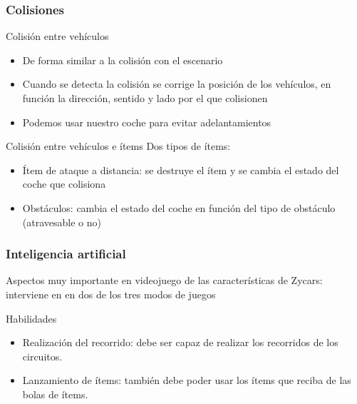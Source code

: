 \begin{frame}
    \frametitle{Colisiones}
    
    \begin{block}{Colisión entre vehículos}
        \begin{itemize}
            \item De forma similar a la colisión con el escenario
            \item Cuando se detecta la colisión se corrige la posición de los vehículos, en función la dirección, 
            sentido y lado por el que colisionen
            \item Podemos usar nuestro coche para evitar adelantamientos
        \end{itemize}
    \end{block}
    
    \begin{block}{Colisión entre vehículos e ítems}
    Dos tipos de ítems:
      \begin{itemize}
            \item Ítem de ataque a distancia: se destruye el ítem y
            se cambia el estado del coche que colisiona
            \item Obstáculos: cambia el estado del coche en función del tipo de obstáculo (atravesable o no)
        \end{itemize}
    \end{block}

\end{frame}

\begin{frame}
    \frametitle{Inteligencia artificial}
    Aspectos muy importante en videojuego de las características
    de Zycars: interviene en en dos de los tres modos de
    juegos

        \begin{block}{Habilidades}
            \begin{itemize}
                \item Realización del recorrido: debe ser capaz de realizar los 
                recorridos de los circuitos.
                \item Lanzamiento de ítems: también debe poder usar los ítems que reciba de las bolas de ítems.
            \end{itemize}
        \end{block}
\end{frame}

